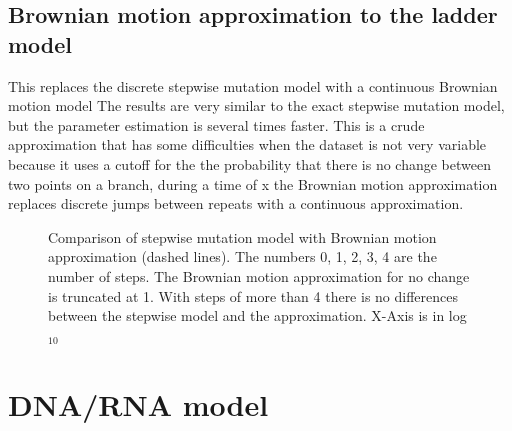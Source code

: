 \subsection{Brownian motion approximation to the ladder model}
This replaces the discrete stepwise mutation model with a continuous Brownian motion model
The results are very similar to the exact stepwise mutation model, but the parameter
estimation is several times faster. This is a crude approximation that has some difficulties when the dataset is not very variable because it uses a cutoff for the the probability that there is no change between two points on a branch, during a time of x  the Brownian motion approximation replaces discrete jumps between repeats with a continuous approximation.
\begin{figure}[thb]
\begin{center}
\end{center}
\caption{Comparison of stepwise mutation model with Brownian motion approximation (dashed lines).  The numbers 0, 1, 2, 3, 4 are the number of steps. The Brownian motion approximation for no change is truncated at 1. With steps of more than 4 there is no differences between the stepwise model and the approximation. X-Axis is in log$_10$}
\label{BROWNFIG}
\end{figure}

 
\section{DNA/RNA model}
